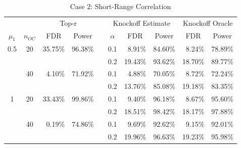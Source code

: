 \documentclass[a4paper,12pt]{article}
\begin{document}
\begin{table}[htbp]
  \centering
  \caption{Case 2: Short-Range Correlation}
    \begin{tabular}{ccrrrrrrrr}
    \midrule
      &   & \multicolumn{2}{c}{Top-r} &   & \multicolumn{3}{c}{Knockoff Estimate} & \multicolumn{2}{c}{Knockoff Oracle} \\
\cmidrule{3-4}\cmidrule{6-10}    \multicolumn{1}{c}{$\mu_1$} & \multicolumn{1}{c}{$n_{OC}$} & \multicolumn{1}{c}{FDR} & \multicolumn{1}{c}{Power} &   & \multicolumn{1}{c}{$\alpha$} & \multicolumn{1}{c}{FDR} & \multicolumn{1}{c}{Power} & \multicolumn{1}{c}{FDR} & \multicolumn{1}{c}{Power} \\
\cmidrule{1-4}\cmidrule{6-10}    0.5 & 20 & 35.75\% & 96.38\% &   & 0.1 & 8.91\% & 84.60\% & 8.24\% & 78.89\% \\
      &   &   &   &   & 0.2 & 19.43\% & 93.62\% & 18.70\% & 89.77\% \\
      & 40 & 4.10\% & 71.92\% &   & 0.1 & 4.88\% & 70.05\% & 8.72\% & 72.24\% \\
      &   &   &   &   & 0.2 & 13.76\% & 85.08\% & 19.18\% & 83.35\% \\
    1 & 20 & 33.43\% & 99.86\% &   & 0.1 & 9.40\% & 96.18\% & 8.67\% & 95.60\% \\
      &   &   &   &   & 0.2 & 18.51\% & 98.42\% & 18.17\% & 97.88\% \\
      & 40 & 0.19\% & 74.86\% &   & 0.1 & 9.69\% & 92.62\% & 9.15\% & 92.01\% \\
      &   &   &   &   & 0.2 & 19.96\% & 96.63\% & 19.23\% & 95.98\% \\
      \midrule
    \end{tabular}%
  \label{tab:addlabel}%
\end{table}%
\end{document}
